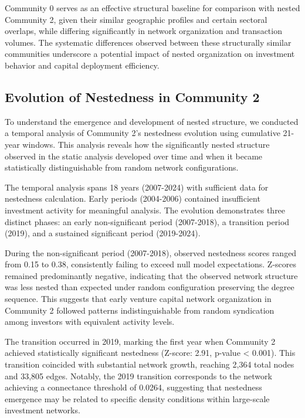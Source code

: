 Community 0 serves as an effective structural baseline for comparison with nested Community 2, given their similar geographic profiles and certain sectoral overlaps, while differing significantly in network organization and transaction volumes. The systematic differences observed between these structurally similar communities underscore a potential impact of nested organization on investment behavior and capital deployment efficiency.

\subsection{Evolution of Nestedness in Community 2}

To understand the emergence and development of nested structure, we conducted a temporal analysis of Community 2's nestedness evolution using cumulative 21-year windows. This analysis reveals how the significantly nested structure observed in the static analysis developed over time and when it became statistically distinguishable from random network configurations.

The temporal analysis spans 18 years (2007-2024) with sufficient data for nestedness calculation. Early periods (2004-2006) contained insufficient investment activity for meaningful analysis. The evolution demonstrates three distinct phases: an early non-significant period (2007-2018), a transition period (2019), and a sustained significant period (2019-2024).

During the non-significant period (2007-2018), observed nestedness scores ranged from 0.15 to 0.38, consistently failing to exceed null model expectations. Z-scores remained predominantly negative, indicating that the observed network structure was less nested than expected under random configuration preserving the degree sequence. This suggests that early venture capital network organization in Community 2 followed patterns indistinguishable from random syndication among investors with equivalent activity levels.

The transition occurred in 2019, marking the first year when Community 2 achieved statistically significant nestedness (Z-score: 2.91, p-value < 0.001). This transition coincided with substantial network growth, reaching 2,364 total nodes and 33,805 edges. Notably, the 2019 transition corresponds to the network achieving a connectance threshold of 0.0264, suggesting that nestedness emergence may be related to specific density conditions within large-scale investment networks.

